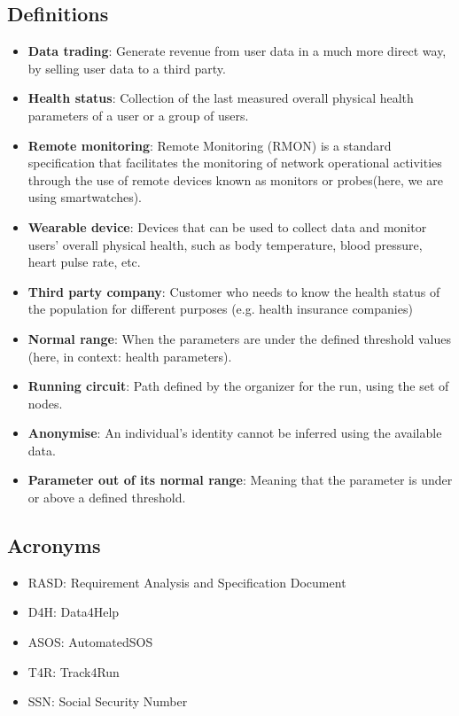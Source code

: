 \documentclass[a4paper, hidelinks, 12pt]{report}
\begin{document}
	\subsection{Definitions}
	\begin{itemize}
		\item{\textbf{Data trading}}: Generate revenue from user data in a much more direct way, by selling user data to a third party.
		\item{\textbf{Health status}}: Collection of the last measured overall physical health parameters of a user or a group of users.
		\item{\textbf{Remote monitoring}}: Remote Monitoring (RMON) is a standard specification that facilitates the monitoring of network operational activities through the use of remote devices known as monitors or probes(here, we are using smartwatches).
		\item{\textbf{Wearable device}}: Devices that can be used to collect data and monitor users' overall physical health, such as body temperature, blood pressure, heart pulse rate, etc.
		\item{\textbf{Third party company}}: Customer who needs to know the health status of the population for different purposes (e.g. health insurance companies)
		\item{\textbf{Normal range}}: When the parameters are under the defined threshold values (here, in context: health parameters).
		\item{\textbf{Running circuit}}: Path defined by the organizer for the run, using the set of nodes.
		\item{\textbf{Anonymise}}: An individual's identity cannot be inferred using the available data.
		\item{\textbf{Parameter out of its normal range}}: Meaning that the parameter is under or above a defined threshold.
	\end{itemize}
	
	\subsection{Acronyms}
	\begin{itemize}
		\item{RASD}: Requirement Analysis and Specification Document
		\item{D4H}: Data4Help
		\item{ASOS}: AutomatedSOS
		\item{T4R}: Track4Run
		\item{SSN}: Social Security Number
	\end{itemize}
	
\end{document}
